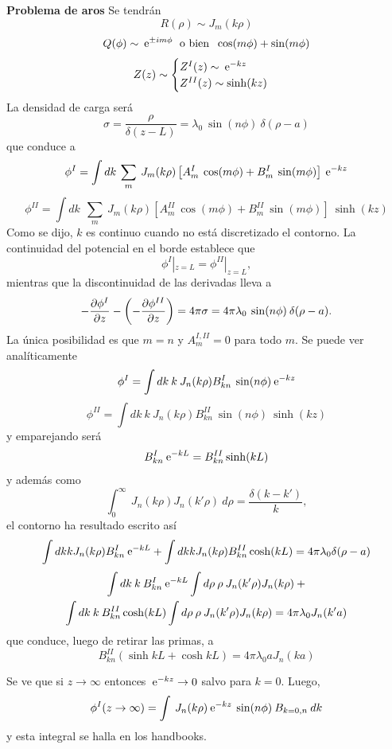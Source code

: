 \documentclass[10pt,oneside]{CBFT_book}
\begin{document}
\begin{ejemplo}{\bf Problema de aros}
Se tendrán
\[
	R(\rho) \sim J_m(k\rho)
\]
\[
	Q(\phi) \sim \:\mathrm{e}^{\pm i m \phi } \;\text{ o bien }\; \cos(m\phi) + \sin(m\phi)
\]
\[
	Z(z) \sim \begin{cases}
	           Z^I(z) \sim \:\mathrm{e}^{-kz} \\
	           Z^{II}(z) \sim \sinh(kz)
	          \end{cases}
\]
La densidad de carga será
\[
	\sigma = \frac{\rho}{ \delta(z-L)} = \lambda_0 \: \sin (n\phi) \: \delta(\rho-a)
\]
que conduce a
\[
	\phi^I = \int dk \: \sum_{m} \: J_m(k\rho) 
	\left[ A^I_{m} \: \cos(m\phi) + B^I_{m} \: \sin(m\phi) \right] \:\mathrm{e}^{-kz}
\]
\[
	\phi^{II} = \int dk \: \: \sum_{m} \: J_m(k\rho) 
	\left[ A^{II}_{m} \: \cos(m\phi) + B^{II}_{m} \: \sin(m\phi) \right] \: \sinh(kz)
\]
Como se dijo, $k$ es continuo cuando no está discretizado el contorno.
La continuidad del potencial en el borde establece que
\[
	\phi^{I}|_{z=L} = \phi^{II}|_{z=L},
\]
mientras que la discontinuidad de las derivadas lleva a 
\[
	- \frac{\partial^{\hspace{-0.05em}} {\phi^{I}}}{\partial {z}^{\hspace{-0.05em}}} - \left( - \frac{\partial^{\hspace{-0.05em}} {\phi^{II}}}{\partial {z}^{\hspace{-0.05em}}} \right) = 
	4\pi \sigma = 4 \pi \lambda_0 \: \sin (n\phi) \: \delta(\rho-a).
\]
La única posibilidad es que $ m = n $ y $ A_m^{I,II} = 0 $ para todo $m$.
Se puede ver analíticamente
\[
	\phi^I = \int dk \: k \: J_n(k\rho) B^I_{kn} \: \sin(n\phi) \:\mathrm{e}^{-kz}
\]
\[
	\phi^{II} = \int dk \: k \: J_n(k\rho) B^{II}_{kn} \: \sin(n\phi) \: \sinh(kz)
\]
y emparejando será
\[
	B_{kn}^I \:\mathrm{e}^{-kL} = B_{kn}^{II} \sinh(kL)
\]
y además como
\[
	\int_0^\infty \: J_n(k\rho) J_n(k'\rho) \: d\rho = \frac{\delta(k-k')}{k},
\]
el contorno ha resultado escrito así
\[
	\int dk k  J_n(k\rho) B^I_{kn} \:\mathrm{e}^{-kL} + \int dk k  J_n(k\rho) B^{II}_{kn} \cosh(kL)
	= 4 \pi \lambda_0 \delta( \rho - a )
\]
\begin{multline*}
	\int dk \: k \: B^I_{kn} \:\mathrm{e}^{-kL} \int d\rho \: \rho \: J_n(k'\rho) J_n(k\rho) \: + \\
	\int dk \: k \: B^{II}_{kn} \cosh(kL) \int d\rho \: \rho \: J_n(k'\rho) J_n(k\rho) 
	= 4 \pi \lambda_0 J_n(k' a) 
\end{multline*}
que conduce, luego de retirar las primas, a 
\[
	B^{II}_{kn}( \sinh kL + \cosh kL ) = 4 \pi \lambda_0 a J_n( k a )
\]

Se ve que si $z \to \infty$ entonces $\:\mathrm{e}^{-kz} \to 0$ salvo para $k=0$.
Luego,
\[
	\phi^I(z\to\infty) = \int \: J_n(k\rho) \:\mathrm{e}^{-kz} \: \sin(n\phi) \: B_{k=0,n}\: dk
\]
y esta integral se halla en los handbooks.
 
\end{ejemplo}
\end{document}
